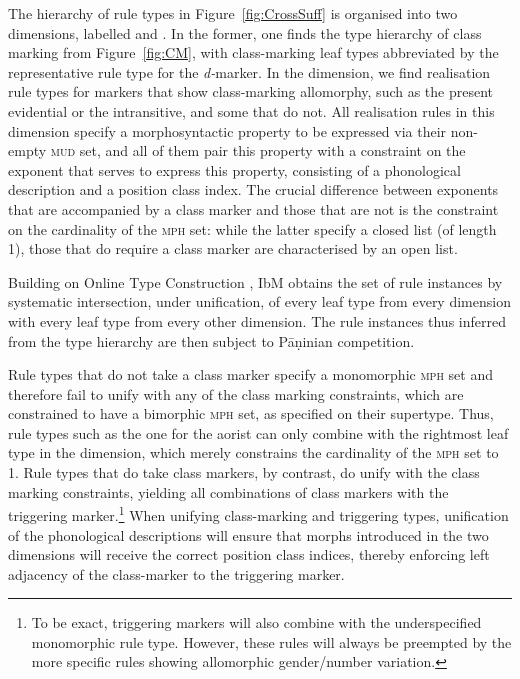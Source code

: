 \documentclass[output=paper]{langsci/langscibook}
\begin{document}
The hierarchy of rule types in Figure~\ref{fig:CrossSuff} is organised
into two dimensions, labelled  and
. In the former, one finds the type hierarchy of
class  marking from Figure~\ref{fig:CM}, with class-marking leaf types
abbreviated by the representative rule type for the
\textit{d-}marker. In the  dimension, we find
realisation rule types for markers that show class-marking allomorphy,
such as the present evidential or the intransitive, and some that do
not. All realisation rules in this dimension specify a morphosyntactic
property to be expressed via their non-empty \textsc{mud} set, and all
of them pair this property with a constraint on the exponent that
serves to express this property, consisting of a phonological
description and a position class index. The crucial difference between
exponents that are accompanied by a class marker and those that are not
is the constraint on the cardinality of the \textsc{mph} set: while
the latter specify a closed list (of length 1), those that do
require a class marker are characterised by an open list.

Building on Online Type Construction \citep{Koenig94}, IbM obtains the
set of rule instances by systematic intersection, under unification,
of every leaf type from every dimension with every leaf type from
every other dimension. The rule instances thus inferred from the type
hierarchy are then subject to Pāṇinian competition.

Rule types that do not take a class marker specify a monomorphic
\textsc{mph} set and therefore fail to unify with any of the class
marking constraints, which are constrained to have a bimorphic
\textsc{mph} set, as specified on their supertype. Thus, rule types
such as the one for the aorist can only combine with the rightmost
leaf type in the  dimension, which merely
constrains the cardinality of the \textsc{mph} set to 1. Rule types
that do take class markers, by contrast, do unify with the class
marking constraints, yielding all combinations of class markers with
the triggering marker.\footnote{To be exact, triggering markers will
  also combine with the underspecified monomorphic rule type. However,
  these rules will always be preempted by the more specific rules
  showing allomorphic gender/number variation.} When unifying
class-marking and triggering types, unification of the phonological
descriptions will ensure that morphs introduced in the two dimensions
will receive the correct position class indices, thereby enforcing
left adjacency of the class-marker to the triggering marker.
\end{document}
